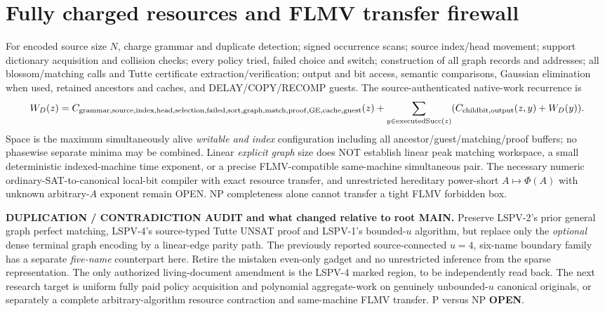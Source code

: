 \documentclass[11pt]{article}
\begin{document}
\section{Fully charged resources and FLMV transfer firewall}
For encoded source size $N$, charge grammar and duplicate detection; signed occurrence scans; source index/head movement; support dictionary acquisition and collision checks; every policy tried, failed choice and switch; construction of all graph records and addresses; all blossom/matching calls and Tutte certificate extraction/verification; output and bit access, semantic comparisons, Gaussian elimination when used, retained ancestors and caches, and DELAY/COPY/RECOMP guests. The source-authenticated native-work recurrence is
\[
 W_D(z)=C_{\rm grammar,source,index,head,selection,failed,sort,graph,match,proof,GE,cache,guest}(z)
 +\sum_{y\in{\rm executedSucc}(z)}(C_{\rm childbit,output}(z,y)+W_D(y)).
\]
Space is the maximum simultaneously alive \emph{writable and index} configuration including all ancestor/guest/matching/proof buffers; no phasewise separate minima may be combined. Linear \emph{explicit graph} size does NOT establish linear peak matching workspace, a small deterministic indexed-machine time exponent, or a precise FLMV-compatible same-machine simultaneous pair. The necessary numeric ordinary-SAT-to-canonical local-bit compiler with exact resource transfer, and unrestricted hereditary power-short $A\mapsto\Phi(A)$ with unknown arbitrary-$A$ exponent remain OPEN. NP completeness alone cannot transfer a tight FLMV forbidden box.

\noindent\textbf{DUPLICATION / CONTRADICTION AUDIT and what changed relative to root MAIN.} Preserve LSPV-2's prior general graph perfect matching, LSPV-4's source-typed Tutte UNSAT proof and LSPV-1's bounded-$u$ algorithm, but replace only the \emph{optional} dense terminal graph encoding by a linear-edge parity path. The previously reported source-connected $u=4$, six-name boundary family has a separate \emph{five-name} counterpart here. Retire the mistaken even-only gadget and no unrestricted inference from the sparse representation. The only authorized living-document amendment is the LSPV-4 marked region, to be independently read back. The next research target is uniform fully paid policy acquisition and polynomial aggregate-work on genuinely unbounded-$u$ canonical originals, or separately a complete arbitrary-algorithm resource contraction and same-machine FLMV transfer. P versus NP \textbf{OPEN}.
\end{document}

